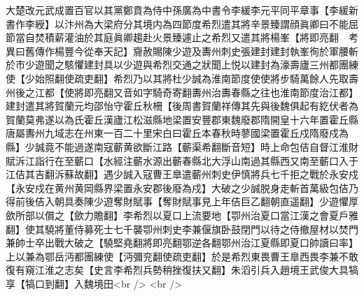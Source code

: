 大楚改元武成置百官以其黨鄭賁為侍中孫廣為中書令李緩李元平同平章事【李緩新書作李綬】以汴州為大梁府分其境内為四節度希烈遣其將辛景臻謂顔眞卿曰不能屈節當自焚積薪灌油於其庭眞卿趨赴火景臻遽止之希烈又遣其將楊峯【將即亮翻　考異曰舊傳作楊豐今從奉天記】齎赦賜陳少遊及夀州刺史張建封建封執峯徇於軍腰斬於市少遊聞之駭懼建封具以少遊與希烈交通之狀聞上悦以建封為濠壽廬三州都團練使【少始照翻使疏吏翻】希烈乃以其將杜少誠為淮南節度使使將步騎萬餘人先取壽州後之江都【使將即亮翻又音如字騎奇寄翻夀州治夀春縣之往也淮南節度治江都】建封遣其將賀蘭元均邵怡守霍丘秋柵【後周書賀蘭祥傳其先與後魏俱起有紇伏者為賀蘭莫弗遂以為氏霍丘漢廬江松滋縣地梁置安豐郡東魏廢郡隋開皇十六年置霍丘縣唐屬夀州九域志在州東一百二十里宋白曰霍丘本春秋時蓼國梁置霍丘戍隋廢戍為縣】少誠竟不能過遂南寇蘄黄欲斷江路【蘄渠希翻斷音短】時上命包佶自督江淮財賦泝江詣行在至蘄口【水經注蘄水源出蘄春縣北大浮山南過其縣西又南至蘄口入于江佶其吉翻泝蘇故翻】遇少誠入寇曹王臯遣蘄州刺史伊慎將兵七千拒之戰於永安戍【永安戍在黄州黄岡縣界梁置永安郡後廢為戍】大破之少誠脱身走斬首萬級包佶乃得前後佶入朝具奏陳少遊奪財賦事【奪財賦事見上年佶巨乙翻朝直遥翻】少遊懼厚歛所部以償之【歛力贍翻】李希烈以夏口上流要地【卾州治夏口當江漢之會夏戶雅翻】使其驍將董侍募死士七千襲卾州刺史李兼偃旗卧鼓閉門以待之侍撤屋材以焚門兼帥士卒出戰大破之【驍堅堯翻將即亮翻鄂逆各翻鄂州治江夏縣即夏口帥讀曰率】上以兼為鄂岳沔都團練使【沔彌兖翻使疏吏翻】於是希烈東畏曹王臯西畏李兼不敢復有窺江淮之志矣【史言李希烈兵勢稍挫復扶又翻】朱滔引兵入趙境王武俊大具犒享【犒口到翻】入魏境田<br />
<br />
